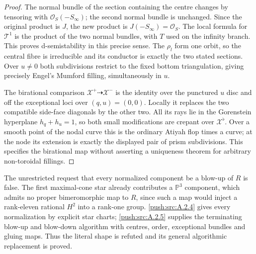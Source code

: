 \begin{proof}
The normal bundle of the section containing the centre changes
by tensoring with $\mathcal O_S(-S_\infty)$; the second normal
bundle is unchanged. Since the original product is $J$, the
new product is $J(-S_\infty)=\mathcal O_S$. The local
formula for $\mathcal T^1$ is the product of the two normal
bundles, with $T$ used on the infinity branch. This proves
d-semistability in this precise sense. The $\rho_l$ form one
orbit, so the central fibre is irreducible and its conductor is
exactly the two stated sections. Over $u\ne0$ both subdivisions
restrict to the fixed bottom triangulation, giving precisely
Engel's Mumford filling, simultaneously in $u$.

The birational comparison $\mathcal X^+\dashrightarrow
\mathcal X^-$ is the identity over the punctured $u$ disc and
off the exceptional loci over $(q,u)=(0,0)$. Locally it replaces
the two compatible side-face diagonals by the other two.
All its rays lie in the Gorenstein hyperplane $h_q+h_u=1$,
so both small modifications are crepant over
$\mathcal X^\flat$. Over a smooth point of the nodal curve
this is the ordinary Atiyah flop times a curve; at the node its
extension is exactly the displayed pair of prism subdivisions.
This specifies the birational map without asserting a uniqueness
theorem for arbitrary non-toroidal fillings.
\end{proof}

\begin{remark}\label{push:src:A.2.3}\label{push:A23}
The unrestricted request that every normalized component
be a blow-up of $R$ is false. The first maximal-cone
star already contributes a $\mathbb P^3$ component,
which admits no proper bimeromorphic map to $R$, since
such a map would inject a rank-eleven rational $H^2$
into a rank-one group. \ref{push:src:A.2.4} gives every normalization
by explicit star charts; \ref{push:src:A.2.5} supplies the terminating
blow-up and blow-down algorithm with centres, order,
exceptional bundles and gluing maps. Thus the literal
shape is refuted and its general algorithmic
replacement is proved.
\end{remark}


